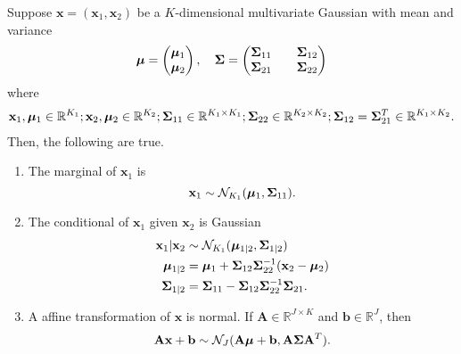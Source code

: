 \begin{theorem}\label{thm:ogag}
    Suppose $\mathbf{x} = (\mathbf{x}_1, \mathbf{x}_2)$ be a $K$-dimensional multivariate Gaussian with mean and variance
    \begin{equation*}
        \boldsymbol{\mu} =
        \begin{pmatrix}
            \boldsymbol{\mu}_1 \\
            \boldsymbol{\mu}_2
        \end{pmatrix}
        ,\quad
        \boldsymbol{\Sigma} =
        \begin{pmatrix}
            \boldsymbol{\Sigma}_{11} &  & \boldsymbol{\Sigma}_{12} \\
            \boldsymbol{\Sigma}_{21} &  & \boldsymbol{\Sigma}_{22} \\
        \end{pmatrix}
    \end{equation*}
    where
    \begin{align*}
        \mathbf{x}_1, \boldsymbol{\mu}_1 \in \mathbb{R}^{K_1};
        \mathbf{x}_2, \boldsymbol{\mu}_2 \in \mathbb{R}^{K_2};
        \boldsymbol{\Sigma}_{11} \in \mathbb{R}^{K_1 \times K_1};
        \boldsymbol{\Sigma}_{22} \in \mathbb{R}^{K_2 \times K_2};
        \boldsymbol{\Sigma}_{12} = \boldsymbol{\Sigma}_{21}^{T} \in \mathbb{R}^{K_1 \times K_2}.
    \end{align*}
    Then, the following are true.
    \begin{enumerate}
        \item
            The marginal of $\mathbf{x}_1$ is
            \begin{equation*}
                \mathbf{x}_{1} \sim \mathcal{N}_{K_1}(\boldsymbol{\mu}_1, \boldsymbol{\Sigma}_{11}).
            \end{equation*}

        \item
            The conditional of $\mathbf{x}_1$ given $\mathbf{x}_2$ is Gaussian
            \begin{align*}
                \mathbf{x}_1 | \mathbf{x}_2 &\sim \mathcal{N}_{K_1}(\boldsymbol{\mu}_{1 | 2}, \boldsymbol{\Sigma}_{1 | 2}) \\
                \boldsymbol{\mu}_{1 | 2} &= \boldsymbol{\mu}_1 + \boldsymbol{\Sigma}_{12} \boldsymbol{\Sigma}_{22}^{-1} (\mathbf{x}_2 - \boldsymbol{\mu}_2) \\
                \boldsymbol{\Sigma}_{1|2 } &= \boldsymbol{\Sigma}_{11} - \boldsymbol{\Sigma}_{12} \boldsymbol{\Sigma}_{22}^{-1} \boldsymbol{\Sigma}_{21}.
            \end{align*}

        \item
            A affine transformation of $\mathbf{x}$ is normal.
            If $\mathbf{A} \in \mathbb{R}^{J \times K}$ and $\mathbf{b} \in \mathbb{R}^{J}$, then
            \begin{equation*}
                \mathbf{Ax} + \mathbf{b} \sim \mathcal{N}_J(
                \mathbf{A} \boldsymbol{\mu} + \mathbf{b},
                \mathbf{A} \boldsymbol{\Sigma} \mathbf{A}^{T}
                ).
            \end{equation*}


\end{enumerate}
\end{theorem}
